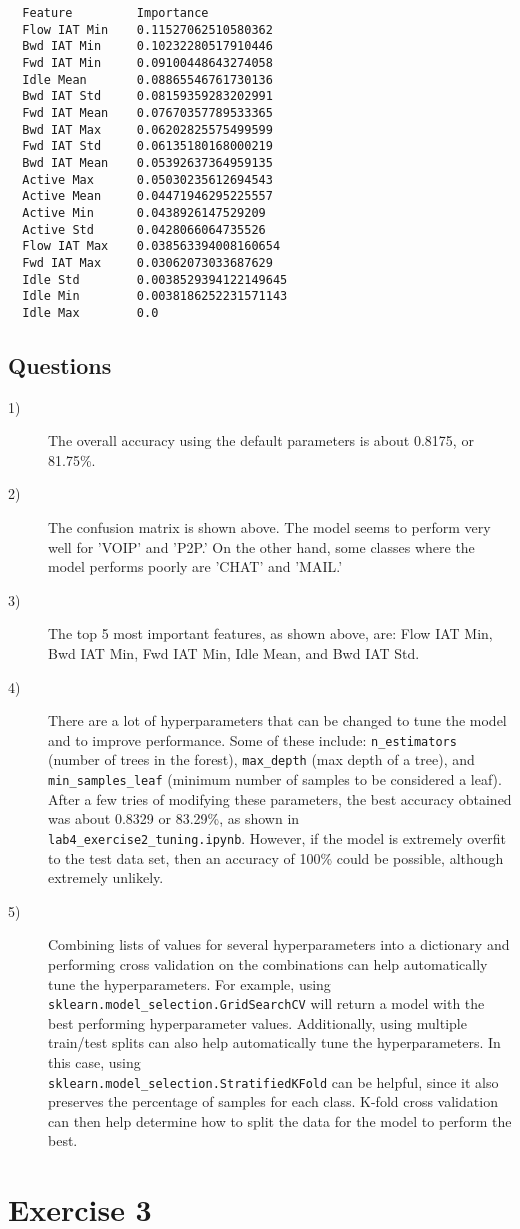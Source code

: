 \documentclass[11pt]{article}
\begin{document}
\begin{verbatim}
  Feature         Importance
  Flow IAT Min    0.11527062510580362
  Bwd IAT Min     0.10232280517910446
  Fwd IAT Min     0.09100448643274058
  Idle Mean       0.08865546761730136
  Bwd IAT Std     0.08159359283202991
  Fwd IAT Mean    0.07670357789533365
  Bwd IAT Max     0.06202825575499599
  Fwd IAT Std     0.06135180168000219
  Bwd IAT Mean    0.05392637364959135
  Active Max      0.05030235612694543
  Active Mean     0.04471946295225557
  Active Min      0.0438926147529209
  Active Std      0.0428066064735526
  Flow IAT Max    0.038563394008160654
  Fwd IAT Max     0.03062073033687629
  Idle Std        0.0038529394122149645
  Idle Min        0.0038186252231571143
  Idle Max        0.0
\end{verbatim}
\subsection*{Questions}
\begin{description}
  \item[1)] The overall accuracy using the default parameters is about 0.8175, or 81.75\%.
  \item[2)] The confusion matrix is shown above. The model seems to perform very well for 'VOIP' and 'P2P.' On the other hand, some classes where the
    model performs poorly are 'CHAT' and 'MAIL.'
  \item[3)] The top 5 most important features, as shown above, are: Flow IAT Min, Bwd IAT Min, Fwd IAT Min, Idle Mean, and Bwd IAT Std.
  \item[4)] There are a lot of hyperparameters that can be changed to tune the model and to improve performance. Some of these include: \verb|n_estimators| (number of trees
    in the forest), \verb|max_depth| (max depth of a tree), and \verb|min_samples_leaf| (minimum number of samples to be considered a leaf). After a few tries of modifying these
    parameters, the best accuracy obtained was about 0.8329 or 83.29\%, as shown in \\\verb|lab4_exercise2_tuning.ipynb|. However, if the model is extremely overfit to
    the test data set, then an accuracy of 100\% could be possible, although extremely unlikely.
  \item[5)] Combining lists of values for several hyperparameters into a dictionary and performing cross validation on the combinations can help automatically tune
    the hyperparameters. For example, using \\\verb|sklearn.model_selection.GridSearchCV| will return a model with the best performing hyperparameter values. Additionally,
    using multiple train/test splits can also help automatically tune the hyperparameters. In this case, using \\\verb|sklearn.model_selection.StratifiedKFold| can be
    helpful, since it also preserves the percentage of samples for each class. K-fold cross validation can then help determine how to split the data for the model to
    perform the best.
\end{description}
\section*{Exercise 3}



\end{document}
